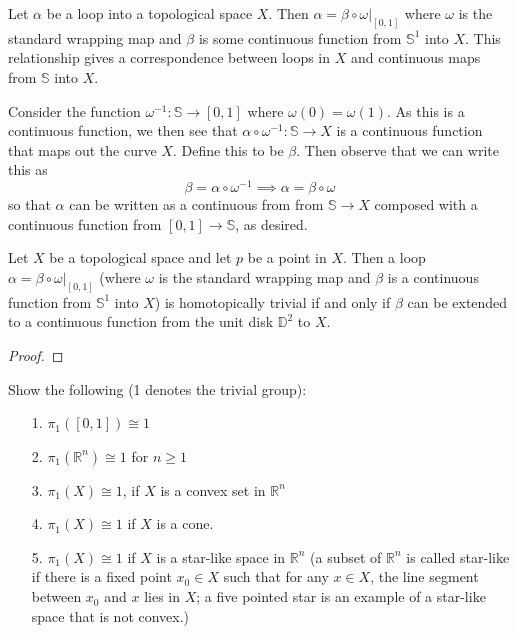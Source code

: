 \documentclass[a4paper,12pt,twoside]{hmcpset}
\begin{document}
\begin{exercise}[Exercise 13.9]
Let $\alpha$ be a loop into a topological
space $X$. Then $\alpha = \beta \circ \omega|_{[0,1]}$ where $
\omega$ is the standard wrapping map and $\beta$ is some continuous
function from $\mathbb{S}^1$ into $X$. This relationship gives a
correspondence between loops in $X$ and continuous maps from
$\mathbb{S}$ into $X$.
\end{exercise}

\begin{solution}
Consider the function $\omega^{-1} : \mathbb{S} \to [0, 1]$ where
$\omega(0) = \omega(1)$. As this is a continuous function, we then see
that $\alpha \circ \omega^{-1} : \mathbb{S} \to X$ is a continuous
function that maps out the curve $X$. Define this to be $\beta$. Then
observe that we can write this as 
\[
    \beta = \alpha \circ \omega^{-1} \implies \alpha = \beta \circ \omega  
\]
so that $\alpha$ can be written as a continuous from from $\mathbb{S}
\to X$ composed with a continuous function from $[0, 1] \to
\mathbb{S}$, as desired.
\end{solution}

\begin{problem}[Theorem 13.10]
    Let $X$ be a topological space and let $p$ be a point in $X$.
    Then a loop $\alpha = \beta \circ \omega|_{[0, 1]}$ (where
    $\omega$ is the standard wrapping map and $\beta$ is a continuous
    function from $\mathbb{S}^1$ into $X$) is homotopically trivial if
    and only if $\beta$ can be extended to a continuous function from
    the unit disk $\mathbb{D}^2$ to $X$.
\end{problem}

\begin{proof}
    
\end{proof}

\begin{problem}[Theorem 13.11]
    Show the following (1 denotes the trivial group):
    \begin{itemize}
        \item[1.] $\pi_1([0, 1]) \cong 1$
        \item[2.] $\pi_1(\mathbb{R}^n) \cong 1$ for $n \ge 1$
        \item[3.] $\pi_1(X) \cong 1$, if $X$ is a convex set in $\mathbb{R}^n$
        \item[4.] $\pi_1(X)  \cong 1$ if $X$ is a cone.
        \item[5.] $\pi_1(X) \cong 1$ if $X$ is a star-like space in
        $\mathbb{R}^n$ (a subset of $\mathbb{R}^n$ is called star-like
        if there is a fixed point $x_0 \in X$ such that for any $x \in
        X$, the line segment between $x_0$ and $x$ lies in $X$; a
        five pointed star is an example of a star-like space that is
        not convex.)    
        
    \end{itemize}
\end{problem}
\end{document}
